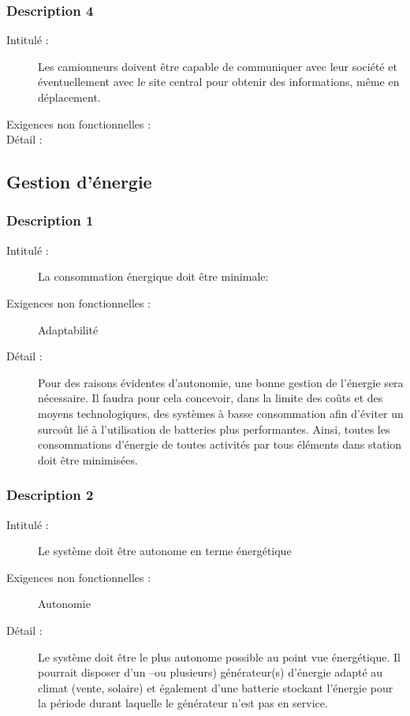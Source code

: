 \subsubsection {Description 4}
\begin{description}
           \item[Intitulé :] Les camionneurs doivent être capable de communiquer avec leur société et éventuellement avec le site central pour obtenir des informations, même en déplacement.
           \item[Exigences non fonctionnelles :] 
           \item[Détail :] 
\end{description}


\subsection {Gestion d'énergie}
\subsubsection {Description 1}
\begin{description}
           \item[Intitulé :] La consommation énergique doit être minimale:
           \item[Exigences non fonctionnelles :] Adaptabilité 
           \item[Détail :] Pour des raisons évidentes d'autonomie,  une bonne gestion de l'énergie sera nécessaire. Il faudra pour cela concevoir, dans la limite des coûts et des moyens technologiques, des systèmes à basse consommation afin d'éviter un surcoût lié à l'utilisation de batteries plus performantes. Ainsi, toutes les consommations d’énergie de toutes activités par tous éléments dans station doit être minimisées.  
\end{description}

\subsubsection {Description 2}
\begin{description}
           \item[Intitulé :] Le système doit être autonome en terme énergétique 
           \item[Exigences non fonctionnelles :] Autonomie
           \item[Détail :] Le système doit être le plus autonome possible au point vue énergétique. Il pourrait disposer d’un –ou plusieurs) générateur(s) d’énergie adapté au climat (vente, solaire) et également d’une batterie stockant l'énergie pour la période durant laquelle le générateur n'est pas en service. 
\end{description}
